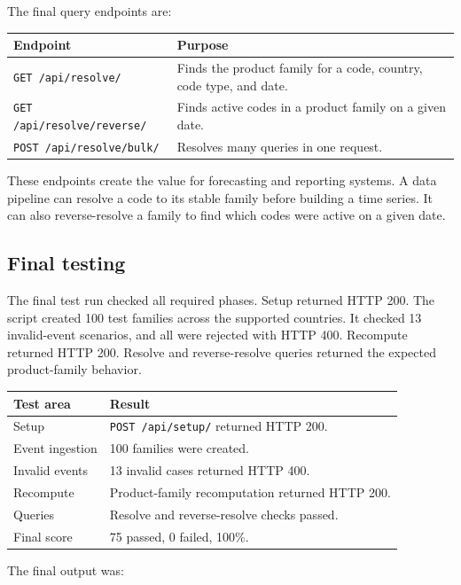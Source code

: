 \documentclass[12pt]{article}
\begin{document}
The final query endpoints are:

\begin{longtable}{|p{}|p{}|}
\hline
\textbf{Endpoint} & \textbf{Purpose} \\
\hline
\texttt{GET /api/resolve/} & Finds the product family for a code, country, code type, and date. \\
\hline
\texttt{GET /api/resolve/reverse/} & Finds active codes in a product family on a given date. \\
\hline
\texttt{POST /api/resolve/bulk/} & Resolves many queries in one request. \\
\hline
\end{longtable}

These endpoints create the value for forecasting and reporting systems. A data pipeline can resolve a code to its stable family before building a time series. It can also reverse-resolve a family to find which codes were active on a given date.

\subsection{Final testing}

The final test run checked all required phases. Setup returned HTTP 200. The script created 100 test families across the supported countries. It checked 13 invalid-event scenarios, and all were rejected with HTTP 400. Recompute returned HTTP 200. Resolve and reverse-resolve queries returned the expected product-family behavior.

\begin{longtable}{|p{}|p{}|}
\hline
\textbf{Test area} & \textbf{Result} \\
\hline
Setup & \texttt{POST /api/setup/} returned HTTP 200. \\
\hline
Event ingestion & 100 families were created. \\
\hline
Invalid events & 13 invalid cases returned HTTP 400. \\
\hline
Recompute & Product-family recomputation returned HTTP 200. \\
\hline
Queries & Resolve and reverse-resolve checks passed. \\
\hline
Final score & 75 passed, 0 failed, 100\%. \\
\hline
\end{longtable}

The final output was:
\end{document}

